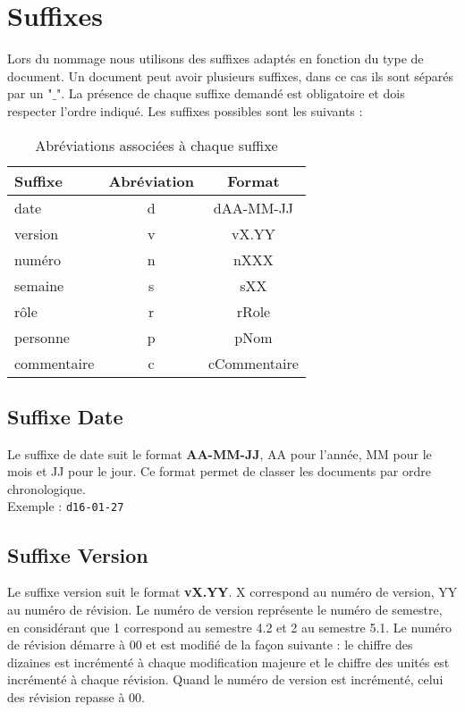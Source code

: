 \section{Suffixes}

Lors du nommage nous utilisons des suffixes adaptés en fonction du type de document. Un document peut avoir plusieurs suffixes, dans ce cas ils sont séparés par un "$\_$". La présence de chaque suffixe demandé est obligatoire et dois respecter l'ordre indiqué. Les suffixes possibles sont les suivants : 

	\begin{table}[H]
		\centering
		\begin{tabularx}{10cm}{|X|c|c|}
		\hline
		\rowcolor[gray]{0.85} Suffixe & Abréviation & Format\\
		\hline
		date & d & dAA-MM-JJ\\
		\hline
		version & v & vX.YY\\
		\hline
		numéro & n & nXXX\\
		\hline
		semaine & s & sXX\\
		\hline
		rôle & r & rRole\\
		\hline
		personne & p & pNom\\
		\hline
		commentaire & c & cCommentaire\\
		\hline
		\end{tabularx}
	\caption{Abréviations associées à chaque suffixe}
	\label{Suffixes}
	\end{table}
	


\subsection{Suffixe Date}
\label{suffixe_date}

Le suffixe de date suit le format \textbf{AA-MM-JJ}, AA pour l'année, MM pour le mois et JJ pour le jour. Ce format permet de classer les documents par ordre chronologique.\\

Exemple : \verb+d16-01-27+

\subsection{Suffixe Version}
\label{suffixe_version}

Le suffixe version suit le format \textbf{vX.YY}. X correspond au numéro de version, YY au numéro de révision. Le numéro de version représente le numéro de semestre, en considérant que 1 correspond au semestre 4.2 et 2 au semestre 5.1. Le numéro de révision démarre à 00 et est modifié de la façon suivante : le chiffre des dizaines est incrémenté à chaque modification majeure et le chiffre des unités est incrémenté à chaque révision. Quand le numéro de version est incrémenté, celui des révision repasse à 00.\\

